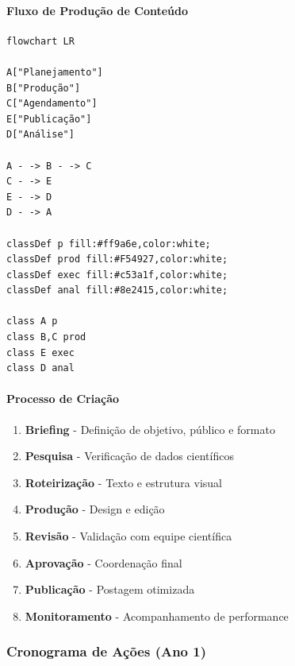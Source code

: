 \paragraph{Fluxo de Produção de Conteúdo}

\begin{verbatim}
flowchart LR

A["Planejamento"]
B["Produção"]
C["Agendamento"]
E["Publicação"]
D["Análise"]

A - -> B - -> C
C - -> E
E - -> D
D - -> A

classDef p fill:#ff9a6e,color:white;
classDef prod fill:#F54927,color:white;
classDef exec fill:#c53a1f,color:white;
classDef anal fill:#8e2415,color:white;

class A p
class B,C prod
class E exec
class D anal
\end{verbatim}

\paragraph{Processo de Criação}

\begin{enumerate}
\item \textbf{Briefing} - Definição de objetivo, público e formato
\item \textbf{Pesquisa} - Verificação de dados científicos
\item \textbf{Roteirização} - Texto e estrutura visual
\item \textbf{Produção} - Design e edição
\item \textbf{Revisão} - Validação com equipe científica
\item \textbf{Aprovação} - Coordenação final
\item \textbf{Publicação} - Postagem otimizada
\item \textbf{Monitoramento} - Acompanhamento de performance
\end{enumerate}

\subsubsection{Cronograma de Ações (Ano 1)}


